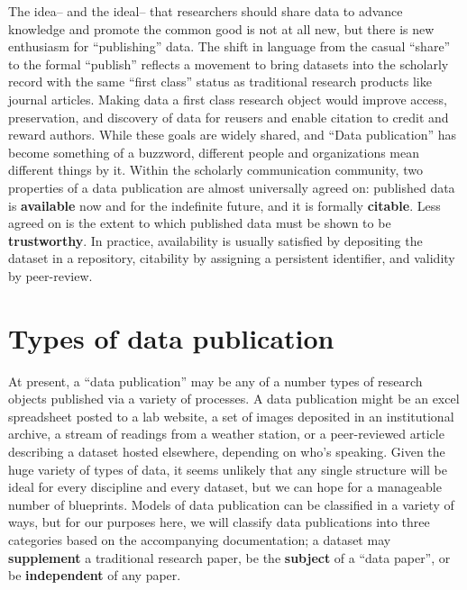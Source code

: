 \documentclass[10pt,a4paper,twocolumn]{article}
\begin{document}
The idea– and the ideal– that researchers should share data to advance knowledge and promote the common good is not at all new, but there is new enthusiasm for ``publishing'' data.  
The shift in language from the casual ``share'' to the formal ``publish'' reflects a movement to bring datasets into the scholarly record with the same ``first class'' status as traditional research products like journal articles.  
Making data a first class research object would improve access, preservation, and discovery of data for reusers and enable citation to credit and reward authors.
While these goals are widely shared, and ``Data publication'' has become something of a buzzword, different people and organizations mean different things by it.
Within the scholarly communication community, two properties of a data publication are almost universally agreed on: published data is \textbf{available} now and for the indefinite future, and it is formally \textbf{citable}. 
Less agreed on is the extent to which published data must be shown to be \textbf{trustworthy}.
In practice, availability is usually satisfied by depositing the dataset in a repository, citability by assigning a persistent identifier, and validity by peer-review.


\section*{Types of data publication}\label{types-of-data-publication}

At present, a ``data publication'' may be any of a number types of research objects published via a variety of processes.
A data publication might be an excel spreadsheet posted to a lab website, a set of images deposited in an institutional archive, a stream of readings from a weather station, or a peer-reviewed article describing a dataset hosted elsewhere, depending on who's speaking.
Given the huge variety of types of data, it seems unlikely that any single structure will be ideal for every discipline and every dataset, but we can hope for a manageable number of blueprints. 
Models of data publication can be classified in a variety of ways, but for our purposes here, we will classify data publications into three categories based on the accompanying documentation; a dataset may \textbf{supplement} a traditional research paper, be the \textbf{subject} of a ``data paper'', or be \textbf{independent} of any paper.
\end{document}
